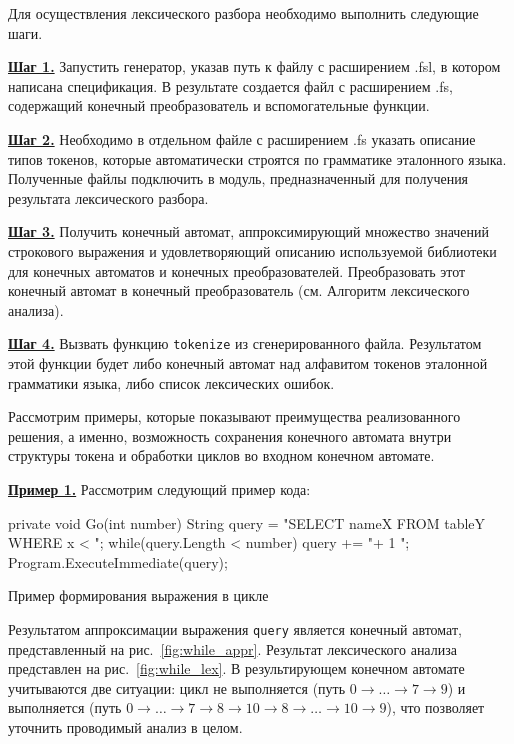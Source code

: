 \documentclass[10pt, conference, compsocconf]{IEEEtran}
\begin{document}
Для осуществления лексического разбора необходимо выполнить следующие шаги.

\textbf{\underline{Шаг 1.}} Запустить генератор, указав путь к файлу с расширением .fsl, в котором написана спецификация. В результате создается файл с расширением .fs, содержащий конечный преобразователь и вспомогательные функции.

\textbf{\underline{Шаг 2.}} Необходимо в отдельном файле с расширением .fs указать описание типов токенов, которые автоматически строятся по грамматике эталонного языка. Полученные файлы подключить в модуль, предназначенный для получения результата лексического разбора. 

\textbf{\underline{Шаг 3.}} Получить конечный автомат, аппроксимирующий множество значений строкового выражения и удовлетворяющий описанию используемой библиотеки для конечных автоматов и конечных преобразователей. Преобразовать этот конечный автомат в конечный преобразователь (см. Алгоритм лексического анализа).

\textbf{\underline{Шаг 4.}}  Вызвать функцию \verb|tokenize| из сгенерированного файла. Результатом этой функции будет либо конечный автомат над алфавитом токенов эталонной грамматики языка, либо список лексических ошибок. 

Рассмотрим примеры, которые показывают преимущества реализованного решения, а именно, возможность сохранения конечного автомата внутри структуры токена и обработки циклов во входном конечном автомате. 

\textbf{\underline{Пример 1.}}
Рассмотрим следующий пример кода:
\begin{listing}[H]
\begin{pyglist}[language=csharp,numbers=none,numbersep=5pt]
private void Go(int number){
   String query = 
        "SELECT nameX FROM tableY WHERE x < ";
   while(query.Length < number){
      query += "+ 1 ";
   }
   Program.ExecuteImmediate(query);
}
\end{pyglist}
\caption{Пример формирования выражения в цикле}
\label{lst:exampleWhile}
\end{listing}

Результатом аппроксимации выражения \verb|query| является конечный автомат, представленный на рис.~\ref{fig:while_appr}. Результат лексического анализа представлен на рис.~\ref{fig:while_lex}. В результирующем конечном автомате учитываются две ситуации: цикл не выполняется (путь $0 \to \ldots \to 7 \to 9$) и выполняется (путь $0 \to \ldots \to 7 \to 8 \to 10 \to 8 \to \ldots \to 10 \to 9$), что позволяет уточнить проводимый анализ в целом. 
\end{document}

